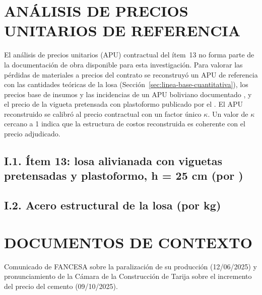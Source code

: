 \chapter{ANÁLISIS DE PRECIOS UNITARIOS DE REFERENCIA}
\label{anx:apu}
El análisis de precios unitarios (APU) contractual del ítem~13 no forma parte de la documentación de obra disponible para esta investigación. Para valorar las pérdidas de materiales a precios del contrato se reconstruyó un APU de referencia con las cantidades teóricas de la losa (Sección~\ref{sec:linea-base-cuantitativa}), los precios base de insumos y las incidencias de un APU boliviano documentado \parencite{cocarico2022}, y el precio de la vigueta pretensada con plastoformo publicado por el \textcite{ine2026precios}. El APU reconstruido se calibró al precio contractual con un factor único $\kappa$. Un valor de $\kappa$ cercano a 1 indica que la estructura de costos reconstruida es coherente con el precio adjudicado.

\section*{I.1. Ítem 13: losa alivianada con viguetas pretensadas y plastoformo, h = 25 cm (por \mdos{})}
{\small{}}

\section*{I.2. Acero estructural de la losa (por kg)}
{\small{}}

\chapter{DOCUMENTOS DE CONTEXTO}
Comunicado de FANCESA sobre la paralización de su producción (12/06/2025) y pronunciamiento de la Cámara de la Construcción de Tarija sobre el incremento del precio del cemento (09/10/2025).



